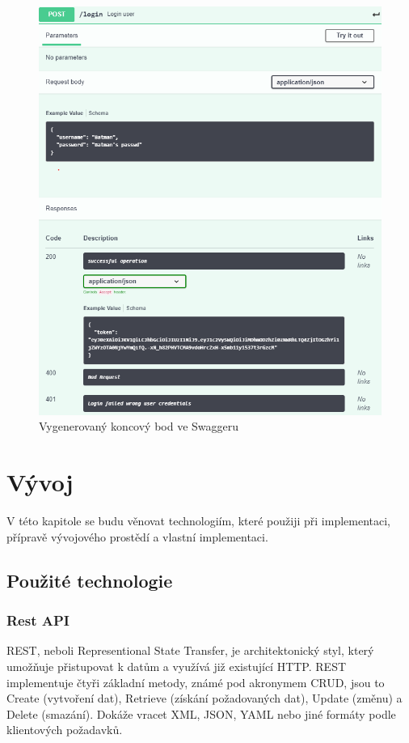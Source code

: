 \documentclass[thesis=B,czech]{FITthesis}[2012/06/26]
\begin{document}
        \begin{figure}[h!] \label{SwaggerGenerated}
            \includegraphics[width=\linewidth]{Swagger_generated_example}
            \caption{Vygenerovaný koncový bod ve Swaggeru}
        \end{figure}        

\chapter{Vývoj}
    V této kapitole se budu věnovat technologiím, které použiji při implementaci, přípravě vývojového prostědí a vlastní implementaci.
    \section{Použité technologie}
        \subsection{Rest API}
        REST, neboli Representional State Transfer, je architektonický styl, který umožňuje přistupovat k datům a využívá již existující HTTP. REST implementuje čtyři základní metody, známé pod akronymem CRUD, jsou to
        Create (vytvoření dat), Retrieve (získání požadovaných dat), Update (změnu) a Delete (smazání). Dokáže vracet XML, JSON, YAML nebo jiné formáty podle klientových požadavků. \cite{rest}
        
\end{document}
